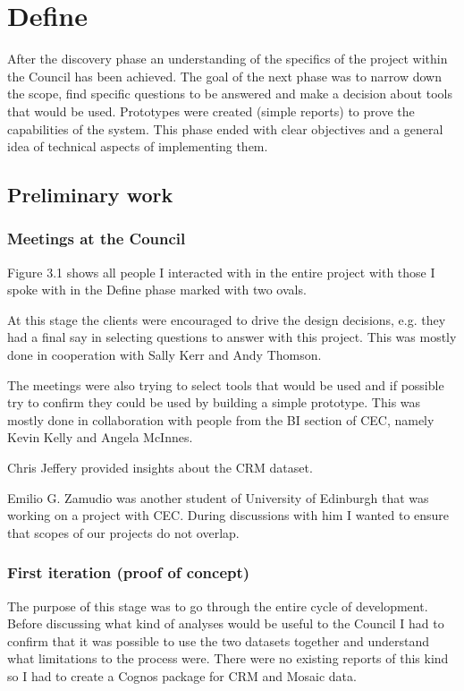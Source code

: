 	\section{Define}
	
After the discovery phase an understanding of the specifics of the project within the Council has been achieved. The goal of the next phase was to narrow down the scope, find specific questions to be answered and make a decision about tools that would be used. Prototypes were created (simple reports) to prove the capabilities of the system. This phase ended with clear objectives and a general idea of technical aspects of implementing them.	
	
		\subsection{Preliminary work}
		
			\subsubsection{Meetings at the Council}
			
Figure 3.1 shows all people I interacted with in the entire project with those I spoke with in the Define phase marked with two ovals.

At this stage the clients were encouraged to drive the design decisions, e.g. they had a final say in selecting questions to answer with this project. This was mostly done in cooperation with Sally Kerr and Andy Thomson.

The meetings were also trying to select tools that would be used and if possible try to confirm they could be used by building a simple prototype. This was mostly done in collaboration with people from the BI section of CEC, namely Kevin Kelly and Angela McInnes.

Chris Jeffery provided insights about the CRM dataset.

Emilio G. Zamudio was another student of University of Edinburgh that was working on a project with CEC. During discussions with him I wanted to ensure that scopes of our projects do not overlap.
			\subsubsection{First iteration (proof of concept)}
			
The purpose of this stage was to go through the entire cycle of development. Before discussing what kind of analyses would be useful to the Council I had to confirm that it was possible to use the two datasets together and understand what limitations to the process were. There were no existing reports of this kind so I had to create a Cognos package for CRM and Mosaic data.


